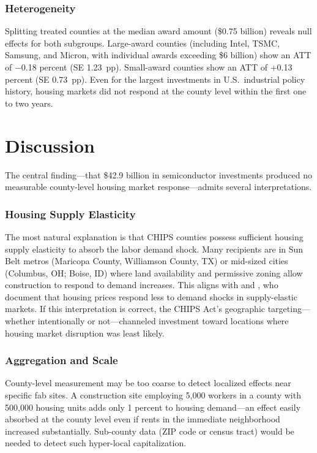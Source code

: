 \documentclass[12pt]{article}
\begin{document}


\subsubsection*{Heterogeneity} Splitting treated counties at the median award amount (\$0.75 billion) reveals null effects for both subgroups. Large-award counties (including Intel, TSMC, Samsung, and Micron, with individual awards exceeding \$6 billion) show an ATT of $-$0.18 percent (SE 1.23~pp). Small-award counties show an ATT of $+$0.13 percent (SE 0.73~pp). Even for the largest investments in U.S.\ industrial policy history, housing markets did not respond at the county level within the first one to two years.



\section{Discussion}
\label{sec:discussion}

The central finding---that \$42.9 billion in semiconductor investments produced no measurable county-level housing market response---admits several interpretations.

\subsubsection*{Housing Supply Elasticity} The most natural explanation is that CHIPS counties possess sufficient housing supply elasticity to absorb the labor demand shock. Many recipients are in Sun Belt metros (Maricopa County, Williamson County, TX) or mid-sized cities (Columbus, OH; Boise, ID) where land availability and permissive zoning allow construction to respond to demand increases. This aligns with \citet{saiz2010geographic} and \citet{glaeser2005housing}, who document that housing prices respond less to demand shocks in supply-elastic markets. If this interpretation is correct, the CHIPS Act's geographic targeting---whether intentionally or not---channeled investment toward locations where housing market disruption was least likely.

\subsubsection*{Aggregation and Scale} County-level measurement may be too coarse to detect localized effects near specific fab sites. A construction site employing 5,000 workers in a county with 500,000 housing units adds only 1 percent to housing demand---an effect easily absorbed at the county level even if rents in the immediate neighborhood increased substantially. Sub-county data (ZIP code or census tract) would be needed to detect such hyper-local capitalization.
\end{document}
